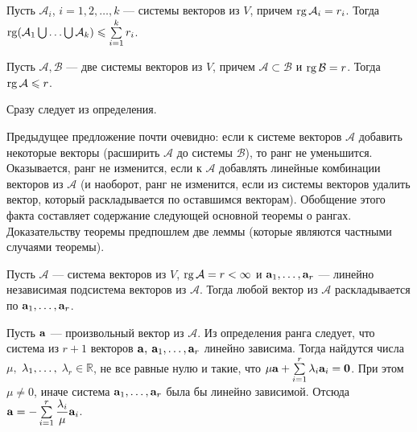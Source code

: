 \begin{sled}\label{sled7_2_5} Пусть $\mathcal{A}_i$, $i=1, 2, \ldots, k$ --- системы векторов из
$V$, причем
$\mathop{\rm rg}\nolimits \mathcal{A}_i = r_i$. Тогда
$\mathop{\rm rg}\nolimits(\mathcal{A}_1 \bigcup \ldots \bigcup \mathcal{A}_k) \leqslant \sum\limits_{i=1}^k r_i$.
\end{sled}



\begin{predl}\label{p5_2_5} 
Пусть $\mathcal{A}, \mathcal{B}$ --- две системы векторов из $V$, причем $\mathcal{A} \subset \mathcal{B}$ и
$\mathop{\rm rg}\nolimits \mathcal{B} = r$. Тогда $\mathop{\rm rg}\nolimits \mathcal{A} \leqslant r$.
\end{predl}
\dok Сразу следует из определения.
\edok

\otstup

Предыдущее предложение почти очевидно: если к системе векторов $\mathcal{A}$ добавить
некоторые векторы (расширить $\mathcal{A}$ до системы $\mathcal{B}$), то ранг не уменьшится.
Оказывается, ранг не изменится, если к $\mathcal{A}$ добавлять линейные комбинации векторов из
$\mathcal{A}$ (и наоборот, ранг не изменится, если из системы векторов удалить вектор,
который раскладывается по оставшимся векторам).
%
Обобщение этого факта составляет содержание следующей основной теоремы о рангах.
Доказательству теоремы предпошлем две леммы (которые являются частными
случаями теоремы).

\begin{lem1} Пусть $\mathcal{A}$ --- система векторов из $V$, 
$\mathop{\rm rg}\nolimits \mathcal{A} = r<\infty $ и $\mathbf{a}_1, \ldots , \mathbf{a}_r$ ---  
линейно независимая подсистема векторов из $\mathcal{A}$.
Тогда любой вектор из $\mathcal{A}$ раскладывается по $\mathbf{a}_1, \ldots , \mathbf{a}_r$.
\end{lem1}
\dok Пусть $\mathbf{a}$ --- произвольный вектор из $\mathcal{A}$.
%
Из определения ранга следует, что система из $r+1$ векторов  $\mathbf{a}, $ $\mathbf{a}_1, \ldots , \mathbf{a}_r$
линейно зависима. Тогда найдутся
числа $\mu, $ $\lambda_1, \hm\ldots , $ $\lambda_r\in \mathbb{R}$, не все равные нулю и такие, что
$\mu \mathbf{a}+ \sum\limits_{i=1}^{r} \lambda_i \mathbf{a}_i = \mathbf{0}$. При этом $\mu \neq 0$, иначе система
$\mathbf{a}_1, \ldots , \mathbf{a}_r$ была бы линейно зависимой. Отсюда
$\mathbf{a} = - \sum\limits_{i=1}^{r} \dfrac{\lambda_i}{\mu} \mathbf{a}_i$.
\edok

